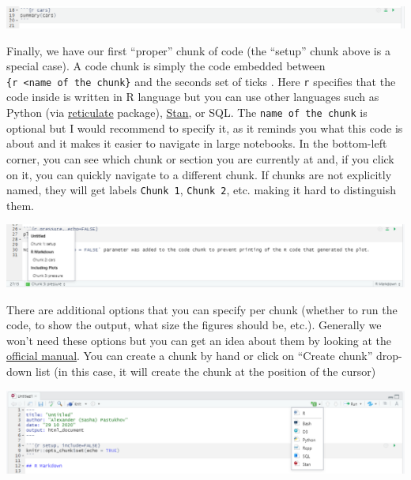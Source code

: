 \documentclass[
]{book}
\begin{document}
\begin{center}\includegraphics[width=1\linewidth]{images/notebook-chunk} \end{center}

Finally, we have our first ``proper'' chunk of code (the ``setup'' chunk above is a special case). A code chunk is simply the code embedded between
\texttt{\textasciigrave{}\textasciigrave{}\textasciigrave{}\{r\ \textless{}name\ of\ the\ chunk\}} and the seconds set of ticks \texttt{\textasciigrave{}\textasciigrave{}\textasciigrave{}}. Here \texttt{r} specifies that the code inside is written in R language but you can use other languages such as Python (via \href{https://rstudio.github.io/reticulate/}{reticulate} package), \href{https://mc-stan.org/}{Stan}, or SQL. The \texttt{name\ of\ the\ chunk} is optional but I would recommend to specify it, as it reminds you what this code is about and it makes it easier to navigate in large notebooks. In the bottom-left corner, you can see which chunk or section you are currently at and, if you click on it, you can quickly navigate to a different chunk. If chunks are not explicitly named, they will get labels \texttt{Chunk\ 1}, \texttt{Chunk\ 2}, etc. making it hard to distinguish them.

\begin{center}\includegraphics[width=1\linewidth]{images/notebook-navigation} \end{center}

There are additional options that you can specify per chunk (whether to run the code, to show the output, what size the figures should be, etc.). Generally we won't need these options but you can get an idea about them by looking at the \href{https://yihui.org/knitr/options/}{official manual}. You can create a chunk by hand or click on ``Create chunk'' drop-down list (in this case, it will create the chunk at the position of the cursor)

\begin{center}\includegraphics[width=1\linewidth]{images/notebook-insert-chunk} \end{center}
\end{document}
